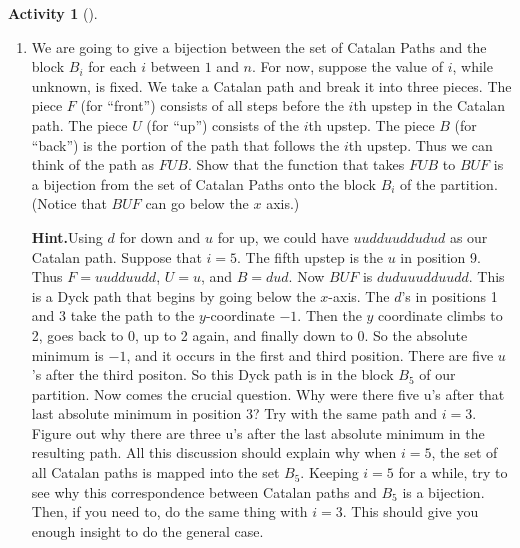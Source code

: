 \documentclass[10pt,]{book}
\theoremstyle{plain}
\theoremstyle{definition}
\newtheorem{activity}[project]{Activity}
\numberwithin{equation}{chapter}
\begin{document}
\begin{activity}[]
\begin{enumerate}[label=(\alph*)]
~\par
\item We are going to give a bijection between the set of Catalan Paths and the block \(B_i\) for each \(i\) between \(1\) and \(n\).  For now, suppose the value of \(i\), while unknown, is fixed.  We take a Catalan path and break it into three pieces.  The piece \(F\) (for ``front'') consists of all steps before the \(i\)th upstep in the Catalan path.  The piece \(U\) (for ``up'') consists of the \(i\)th upstep.  The piece \(B\) (for ``back'') is the portion of the path that follows the \(i\)th upstep.  Thus we can think of the path as \(FUB\).  Show that the function that takes \(FUB\) to \(BUF\) is a bijection from the set of Catalan Paths onto the block \(B_i\) of the partition.  (Notice that \(BUF\) can go below the \(x\) axis.)%
\par\medskip\noindent%
\textbf{Hint.}\quad Using \(d\) for down and \(u\) for up, we could have \(uudduuddudud\) as our Catalan path. Suppose that \(i = 5\). The fifth upstep is the \(u\) in position 9. Thus \(F = uudduudd\), \(U = u\), and \(B = dud\). Now \(BU F\) is \(duduuudduudd\). This is a Dyck path that begins by going below the \(x\)-axis. The \(d\)'s in positions 1 and 3 take the path to the \(y\)-coordinate \(-1\). Then the \(y\) coordinate climbs to 2, goes back to 0, up to 2 again, and finally down to 0. So the absolute minimum is \(-1\), and it occurs in the first and third position. There are five \(u\)’s after the third positon. So this Dyck path is in the block \(B_5\) of our partition. Now comes the crucial question. Why were there five u’s after that last absolute minimum in position 3? Try with the same path and \(i = 3\). Figure out why there are three u’s after the last absolute minimum in the resulting path. All this discussion should explain why when \(i = 5\), the set of all Catalan paths is mapped into the set \(B_5\). Keeping \(i = 5\) for a while, try to see why this correspondence between Catalan paths and \(B_5\) is a bijection. Then, if you need to, do the same thing with \(i = 3\). This should give you enough insight to do the general case.%
\par\medskip\noindent%

\end{enumerate}
\end{activity}
\end{document}
